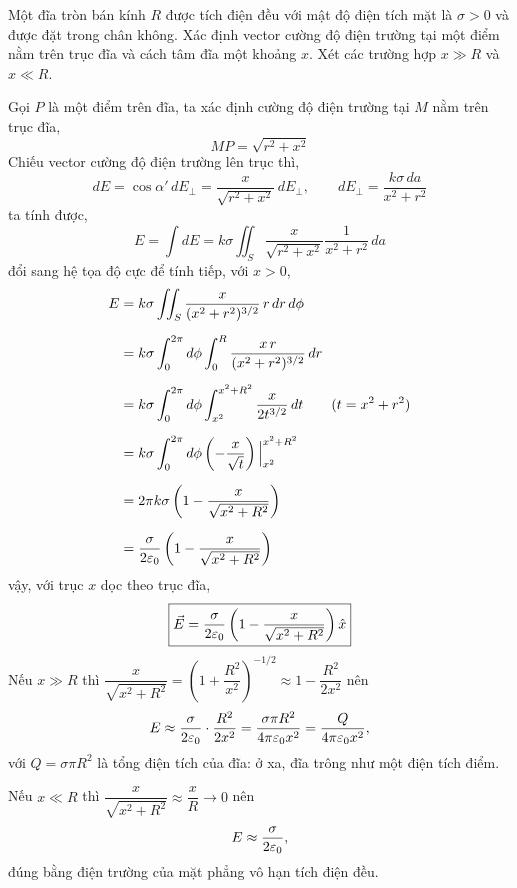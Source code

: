 \begin{problem}
Một đĩa tròn bán kính $R$ được tích điện đều với mật độ điện tích mặt là $\sigma > 0$ và được đặt trong chân không. Xác định vector cường độ điện trường tại một điểm nằm trên trục đĩa và cách tâm đĩa một khoảng $x$. Xét các trường hợp $x \gg R$ và $x \ll R$.
\end{problem}
\begin{sol}
Gọi $P$ là một điểm trên đĩa, ta xác định cường độ điện trường tại $M$ nằm trên trục đĩa,
\[
MP = \sqrt{r^2 + x^2}
\]
Chiếu vector cường độ điện trường lên trục thì,
\[
dE = \cos{\alpha'}\,dE_{\perp} = \frac{x}{\sqrt{r^2 + x^2}}\,dE_{\perp},
\qquad
dE_{\perp} = \frac{k\sigma\,da}{x^2 + r^2}
\]
ta tính được,
\[
E = \int dE = k\sigma \iint_{S} \frac{x}{\sqrt{r^2 + x^2}} \frac{1}{x^2 + r^2} \, da
\]
đổi sang hệ tọa độ cực để tính tiếp, với $x > 0$,
\begin{align*}
E &= k\sigma \iint_{S} \frac{x}{(x^2 + r^2)^{3/2}} \, r\,dr\,d\phi\\[6pt]
  &= k\sigma \int_{0}^{2\pi} d\phi \int_{0}^{R} \frac{x\,r}{(x^2 + r^2)^{3/2}} \, dr\\[6pt]
  &= k\sigma \int_{0}^{2\pi} d\phi \int_{x^2}^{x^2 + R^2} \frac{x}{2t^{3/2}} \, dt \qquad (t = x^2 + r^2)\\[6pt]
  &= k\sigma \int_{0}^{2\pi} d\phi \left(-\frac{x}{\sqrt{t}}\right)\Big|_{x^2}^{x^2+R^2}\\[6pt]
  &= 2\pi k\sigma \left(1 - \frac{x}{\sqrt{x^2+R^2}}\right)\\[6pt]
  &= \frac{\sigma}{2\varepsilon_{0}} \left(1 - \frac{x}{\sqrt{x^2+R^2}}\right)
\end{align*}
vậy, với trục $x$ dọc theo trục đĩa,
\[
\boxed{\vec{E} = \frac{\sigma}{2\varepsilon_{0}} \left(1 - \frac{x}{\sqrt{x^2+R^2}}\right)\hat{x}}
\]
Nếu $x \gg R$ thì $\dfrac{x}{\sqrt{x^2+R^2}} = \left(1+\dfrac{R^2}{x^2}\right)^{-1/2} \approx 1 - \dfrac{R^2}{2x^2}$ nên
\[
E \approx \frac{\sigma}{2\varepsilon_{0}}\cdot\frac{R^2}{2x^2} = \frac{\sigma\pi R^2}{4\pi\varepsilon_{0}x^2} = \frac{Q}{4\pi\varepsilon_{0}x^2},
\]
với $Q = \sigma\pi R^2$ là tổng điện tích của đĩa: ở xa, đĩa trông như một điện tích điểm.

Nếu $x \ll R$ thì $\dfrac{x}{\sqrt{x^2+R^2}} \approx \dfrac{x}{R} \to 0$ nên
\[
E \approx \frac{\sigma}{2\varepsilon_{0}},
\]
đúng bằng điện trường của mặt phẳng vô hạn tích điện đều.
\end{sol}
